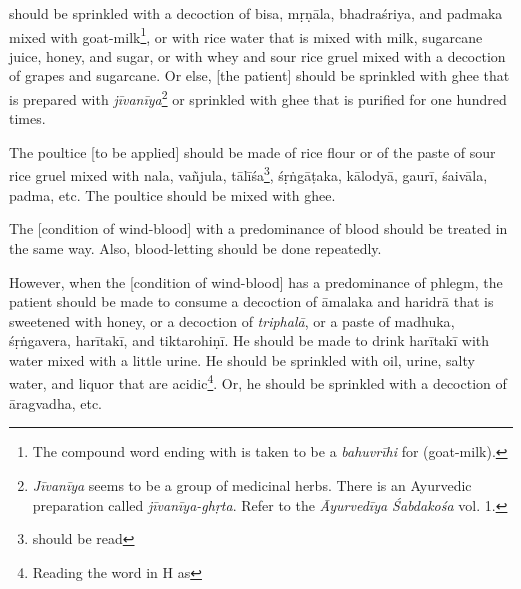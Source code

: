 \begin{translation}
     should be sprinkled with a
    decoction of \gls{bisa}, \gls{mṛṇāla},
    \gls{bhadraśriya}, and \gls{padmaka}
    mixed with goat-milk\footnote{The
        compound word ending with
         is taken to be a
        \textit{bahuvrīhi} for 
        (goat-milk).}, or with rice water that is
    mixed with milk, sugarcane juice, honey,
    and sugar, or with whey and sour rice
    gruel mixed with a decoction of grapes
    and sugarcane. Or else, [the patient]
    should be sprinkled with ghee that is
    prepared with
    \textit{jīvanīya}\footnote{\textit{Jīvanīya}
        seems to be a group of medicinal herbs.
        There is an Ayurvedic preparation called
        \textit{jīvanīya-ghṛta}. Refer to the
        \textit{Āyurvedīya Śabdakośa} vol. 1.} or
    sprinkled with ghee that is purified for one
    hundred times.

    The poultice [to be applied] should
    be made of rice flour or of the paste
    of sour rice gruel mixed with
    \gls{nala}, \gls{vañjula},
    \gls{tālīśa}\footnote{
        should be read },
    \gls{śṛṅgāṭaka}, \gls{kālodyā},
    \gls{gaurī}, \gls{śaivāla},
    \gls{padma}, etc. The poultice
    should be mixed with ghee.

    \begin{tt}
        \raggedright
        \bigskip

        \item[9]
        The [condition of wind-blood]
        with a predominance of blood
        should be treated in the same
        way. Also, blood-letting should
        be done repeatedly.

        \item[10]
        However, when the [condition of
                wind-blood] has a predominance
        of phlegm, the patient should be
        made to consume a decoction of
        \gls{āmalaka} and
        \gls{haridrā} that is sweetened
        with honey, or a decoction of
        \textit{triphalā}, or a paste of
        \gls{madhuka},
        \gls{śṛṅgavera}, \gls{harītakī},
        and \gls{tiktarohiṇī}. He should
        be made to drink \gls{harītakī}
        with water mixed with a little
        urine. He should be sprinkled
        with oil, urine, salty water, and
        liquor that are
        acidic\footnote{Reading the
            word  in H as
            }. Or, he should be
        sprinkled with a decoction of
        \gls{āragvadha}, etc.


\end{tt}
\end{translation}
